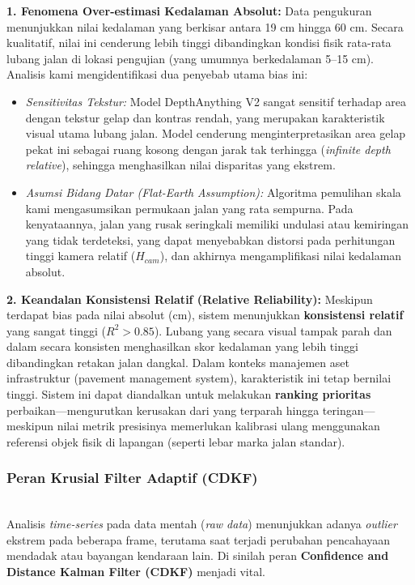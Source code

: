 \documentclass{iopjournal}
\begin{document}
\textbf{1. Fenomena Over-estimasi Kedalaman Absolut:}
Data pengukuran menunjukkan nilai kedalaman yang berkisar antara 19 cm hingga 60 cm. Secara kualitatif, nilai ini cenderung lebih tinggi dibandingkan kondisi fisik rata-rata lubang jalan di lokasi pengujian (yang umumnya berkedalaman 5--15 cm). Analisis kami mengidentifikasi dua penyebab utama bias ini:
\begin{itemize}
    \item \textit{Sensitivitas Tekstur:} Model DepthAnything V2 sangat sensitif terhadap area dengan tekstur gelap dan kontras rendah, yang merupakan karakteristik visual utama lubang jalan. Model cenderung menginterpretasikan area gelap pekat ini sebagai ruang kosong dengan jarak tak terhingga (\textit{infinite depth relative}), sehingga menghasilkan nilai disparitas yang ekstrem.
    \item \textit{Asumsi Bidang Datar (Flat-Earth Assumption):} Algoritma pemulihan skala kami mengasumsikan permukaan jalan yang rata sempurna. Pada kenyataannya, jalan yang rusak seringkali memiliki undulasi atau kemiringan yang tidak terdeteksi, yang dapat menyebabkan distorsi pada perhitungan tinggi kamera relatif ($H_{cam}$), dan akhirnya mengamplifikasi nilai kedalaman absolut.
\end{itemize}

\textbf{2. Keandalan Konsistensi Relatif (Relative Reliability):}
Meskipun terdapat bias pada nilai absolut (cm), sistem menunjukkan \textbf{konsistensi relatif} yang sangat tinggi ($R^2 > 0.85$). Lubang yang secara visual tampak parah dan dalam secara konsisten menghasilkan skor kedalaman yang lebih tinggi dibandingkan retakan jalan dangkal. Dalam konteks manajemen aset infrastruktur (pavement management system), karakteristik ini tetap bernilai tinggi. Sistem ini dapat diandalkan untuk melakukan \textbf{ranking prioritas} perbaikan---mengurutkan kerusakan dari yang terparah hingga teringan---meskipun nilai metrik presisinya memerlukan kalibrasi ulang menggunakan referensi objek fisik di lapangan (seperti lebar marka jalan standar).

\subsubsection{Peran Krusial Filter Adaptif (CDKF)}
\mbox{}\\
Analisis \textit{time-series} pada data mentah (\textit{raw data}) menunjukkan adanya \textit{outlier} ekstrem pada beberapa frame, terutama saat terjadi perubahan pencahayaan mendadak atau bayangan kendaraan lain. Di sinilah peran \textbf{Confidence and Distance Kalman Filter (CDKF)} menjadi vital.
\end{document}

